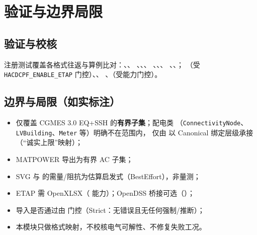 \documentclass[UTF8,fontset=fandol,a4paper,11pt]{ctexart}
\begin{document}
\section{验证与边界局限}
\subsection{验证与校核}
注册测试覆盖各格式往返与算例比对：、、
、、、
、、、
、、；
（受 \texttt{HACDCPF\_ENABLE\_ETAP} 门控）、、
、（受能力门控）。

\subsection{边界与局限（如实标注）}
\begin{itemize}
  \item {} 仅覆盖 CGMES 3.0 EQ+SSH 的\textbf{有界子集}；配电类
        （\texttt{ConnectivityNode}、\texttt{LVBuilding}、\texttt{Meter} 等）明确不在范围内，
        仅由  以 Canonical 绑定层级承接（“诚实上限”映射）；
  \item MATPOWER 导出为有界 AC 子集；
  \item SVG 与  的需量/阻抗为估算启发式（BestEffort），非量测；
  \item ETAP 需 OpenXLSX（ 能力）；OpenDSS 桥接可选（）；
  \item 导入是否通过由  门控（Strict：无错误且无任何强制/推断）；
  \item 本模块只做格式映射，不校核电气可解性、不修复失败工况。
\end{itemize}


\end{document}

